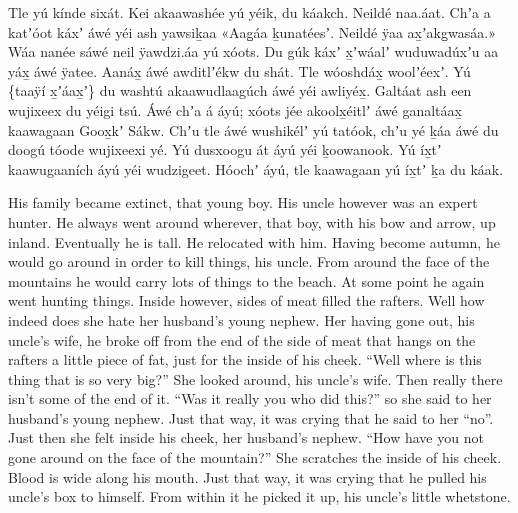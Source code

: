 \begin{pairs}
\begin{Leftside}
Tle yú kínde sixát.
Kei akaawashée yú yéik, du káakch.
Neildé naa\-.áat.
Chʼa a katʼóot káxʼ áwé yéi ash yawsiḵaa
«\!Aag̱áa ḵunatéesʼ.
Neildé ÿaa ax̱ʼakg̱wasáa.\!»
Wáa nanée sáwé neil ÿaw\-dzi.áa yú xóots.
Du gúk káxʼ x̱ʼwáalʼ wudu\-wadúxʼu aa yáx̱ áwé ÿatee.
Aanáx̱ áwé awditlʼékw du shát.
Tle wóoshdáx̱ woolʼéexʼ.
Yú \{taaÿí x̱ʼáax̱ʼ\} du washtú akaawudlaa\-gúch áwé yéi awliyéx̱.
Galtáat ash een wujixeex du yéigi tsú.
Áwé chʼa á áyú;
xóots jée akoolx̱éitlʼ áwé ganaltáax̱ kaawagaan Goox̱kʼ Sákw.
\pend
\pstart
{}Chʼu tle áwé wushikélʼ yú tatóok,
chʼu yé ḵáa áwé du doogú tóode wujixeexi yé.
Yú dusxoogu át áyú yéi ḵoowanook.
Yú íx̱tʼ kaawugaaních áyú yéi wudzigeet.
Hóochʼ áyú, tle kaawagaan yú íx̱tʼ ḵa du káak.
\pend
\endnumbering
\end{Leftside}
\begin{Rightside}
\beginnumbering
\pstart
\noindent
{}His family became extinct, that young boy.
His uncle however was an expert hunter.
He always went around wherever, that boy, with his bow and arrow, up inland.
Eventually he is tall.
He relocated with him.
Having become autumn, he would go around in order to kill things, his uncle.
From around the face of the mountains he would carry lots of things to the beach.
\pend
\pstart
{}At some point he again went hunting things.
Inside however, sides of meat filled the rafters.
Well how indeed does she hate her husband’s young nephew.
Her having gone out, his uncle’s wife, he broke off from the end of the side of meat that hangs on the rafters a little piece of fat, just for the inside of his cheek.
\qqk{}“Well where is this thing that is so very big?”
She looked around, his uncle’s wife.
Then really there isn’t some of the end of it.
\qqk{}“Was it really you who did this?”
so she said to her husband’s young nephew.
Just that way, it was crying that he said to her “no”.
Just then she felt inside his cheek, her husband’s nephew.
\qqk{}“How have you not gone around on the face of the mountain?”
She scratches the inside of his cheek.
Blood is wide along his mouth.
\!Just that way, it was crying that he pulled his uncle’s box to himself.
From within it he picked it up, his uncle’s little whetstone.

\end{Rightside}
\end{pairs}
